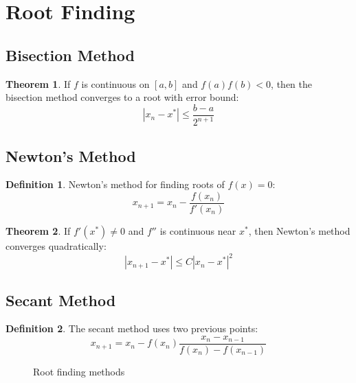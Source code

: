 \documentclass[11pt]{article}
\theoremstyle{definition}
\newtheorem{definition}{Definition}[section]
\newtheorem{theorem}{Theorem}[section]
\begin{document}
\section{Root Finding}

\subsection{Bisection Method}
\begin{theorem}
If $f$ is continuous on $[a,b]$ and $f(a)f(b) < 0$, then the bisection method converges to a root with error bound:
$$|x_n - x^*| \leq \frac{b-a}{2^{n+1}}$$
\end{theorem}

\subsection{Newton's Method}
\begin{definition}
Newton's method for finding roots of $f(x) = 0$:
$$x_{n+1} = x_n - \frac{f(x_n)}{f'(x_n)}$$
\end{definition}

\begin{theorem}
If $f'(x^*) \neq 0$ and $f''$ is continuous near $x^*$, then Newton's method converges quadratically:
$$|x_{n+1} - x^*| \leq C|x_n - x^*|^2$$
\end{theorem}

\subsection{Secant Method}
\begin{definition}
The secant method uses two previous points:
$$x_{n+1} = x_n - f(x_n) \frac{x_n - x_{n-1}}{f(x_n) - f(x_{n-1})}$$
\end{definition}

\begin{figure}[h]
\centering
{}
\caption{Root finding methods}
\end{figure}
\end{document}
